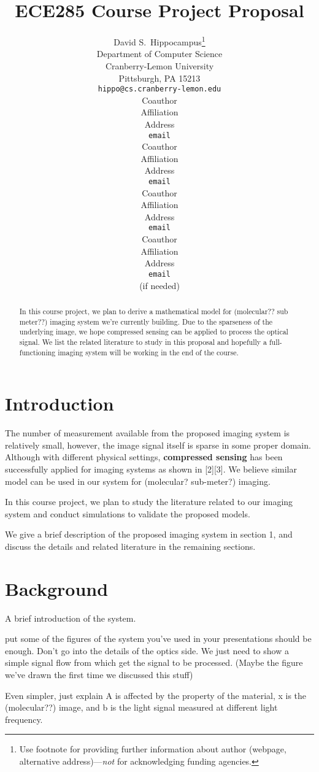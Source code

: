 \documentclass{article} %
\title{ECE285 Course Project Proposal}
\author{
David S.~Hippocampus\thanks{ Use footnote for providing further information
about author (webpage, alternative address)---\emph{not} for acknowledging
funding agencies.} \\
Department of Computer Science\\
Cranberry-Lemon University\\
Pittsburgh, PA 15213 \\
\texttt{hippo@cs.cranberry-lemon.edu} \\
\And
Coauthor \\
Affiliation \\
Address \\
\texttt{email} \\
\AND
Coauthor \\
Affiliation \\
Address \\
\texttt{email} \\
\And
Coauthor \\
Affiliation \\
Address \\
\texttt{email} \\
\And
Coauthor \\
Affiliation \\
Address \\
\texttt{email} \\
(if needed)\\
}
\begin{document}
\maketitle

\begin{abstract}
In this course project, we plan to derive a mathematical model for (molecular?? sub meter??) imaging system we're currently building. Due to the sparseness of the underlying image, we hope compressed sensing can be applied to process the optical signal. We list the related literature to study in this proposal and hopefully a full-functioning imaging system will be working in the end of the course.

\end{abstract}

\section{Introduction}

The number of measurement available from the proposed imaging system is relatively small, however, the image signal itself is sparse in some proper domain. Although with different physical settings, \textbf{compressed sensing} has been successfully applied for imaging systems as shown in [2][3]. We believe similar model can be used in our system for (molecular? sub-meter?) imaging.

In this course project, we plan to study the literature related to our imaging system and conduct simulations to validate the proposed models.

We give a brief description of the proposed imaging system in section 1, and discuss the details and related literature in the remaining sections.


\section{Background}
A brief introduction of the system. 

put some of the figures of the system you've used in your presentations should be enough. Don't go into the details of the optics side. We just need to show a simple signal flow from which get the signal to be processed. (Maybe the figure we've drawn the first time we discussed this stuff)

Even simpler, just explain A is affected by the property of the material, x is the (molecular??) image, and b is the light signal measured at different light frequency.
\end{document}
